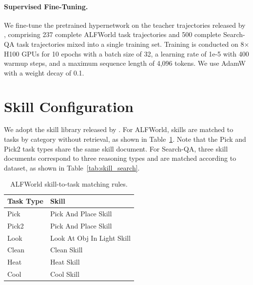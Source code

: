 \documentclass{llmxive}
\providecommand{\arraystretch}{1.05}
\begin{document}
\paragraph{Supervised Fine-Tuning.} We fine-tune the pretrained hypernetwork on the teacher trajectories released by \citet{Xia2026SkillRL}, comprising 237 complete ALFWorld task trajectories and 500 complete Search-QA task trajectories mixed into a single training set. Training is conducted on 8$\times$H100 GPUs for 10 epochs with a batch size of 32, a learning rate of 1e-5 with 400 warmup steps, and a maximum sequence length of 4,096 tokens. We use AdamW with a weight decay of 0.1.

\section{Skill Configuration}
\label{app:skill}

We adopt the skill library released by \citet{Xia2026SkillRL}. For ALFWorld, skills are matched to tasks by category without retrieval, as shown in Table~\ref{tab:skill_alf}. Note that the Pick and Pick2 task types share the same skill document. For Search-QA, three skill documents correspond to three reasoning types and are matched according to dataset, as shown in Table~\ref{tab:skill_search}.

\begin{table}[!htbp]
\centering
\small
\setlength{\tabcolsep}{5pt}
\renewcommand{\arraystretch}{1.1}
\begin{tabular}{ll}
\toprule
\textbf{Task Type} & \textbf{Skill} \\
\midrule
Pick & Pick And Place Skill \\
Pick2 & Pick And Place Skill \\
\midrule
Look & Look At Obj In Light Skill \\
Clean & Clean Skill \\
Heat & Heat Skill \\
Cool & Cool Skill \\
\bottomrule
\end{tabular}
\caption{ALFWorld skill-to-task matching rules.}
\label{tab:skill_alf}
\end{table}
\end{document}
